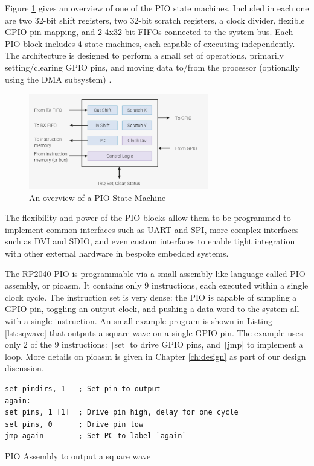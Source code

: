 Figure \ref{fig:pio-sm} gives an overview of one of the PIO state machines. Included in each one are two 32-bit shift registers, two 32-bit scratch registers, a clock divider, flexible GPIO pin mapping, and 2 4x32-bit FIFOs connected to the system bus. Each PIO block includes 4 state machines, each capable of executing independently. The architecture is designed to perform a small set of operations, primarily setting/clearing GPIO pins, and moving data to/from the processor (optionally using the DMA subsystem) \cite{rp2040}.

\begin{figure}[H]
    \centering
    \includegraphics[width=0.7\textwidth]{../img/rp2040-state-machine.png}
    \caption{An overview of a PIO State Machine \citep{rp2040}}
    \label{fig:pio-sm}
\end{figure}

The flexibility and power of the PIO blocks allow them to be programmed to implement common interfaces such as UART and SPI, more complex interfaces such as DVI and SDIO, and even custom interfaces to enable tight integration with other external hardware in bespoke embedded systems.

The RP2040 PIO is programmable via a small assembly-like language called PIO assembly, or pioasm. It contains only 9 instructions, each executed within a single clock cycle. The instruction set is very dense: the PIO is capable of sampling a GPIO pin, toggling an output clock, and pushing a data word to the system all with a single instruction. An small example program is shown in Listing \ref{lst:sqwave} that outputs a square wave on a single GPIO pin. The example uses only 2 of the 9 instructions: \texttt|set| to drive GPIO pins, and \texttt|jmp| to implement a loop. More details on pioasm is given in Chapter \ref{ch:design} as part of our design discussion.

\begin{listing}[H]
    \vspace{0.5cm}
    \begin{verbatim}
set pindirs, 1   ; Set pin to output
again:
set pins, 1 [1]  ; Drive pin high, delay for one cycle
set pins, 0      ; Drive pin low
jmp again        ; Set PC to label `again`
    \end{verbatim}
    \caption{PIO Assembly to output a square wave \citep{rp2040}}
    \label{lst:sqwave}
\end{listing}


